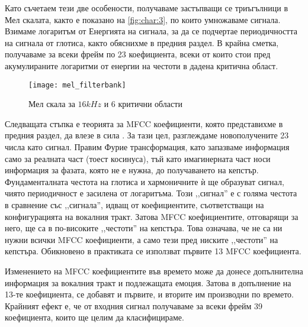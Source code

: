 \documentclass[main.tex]{subfiles}
\begin{document}
    Като съчетаем тези две особености, получаваме застъпващи се триъгълници в Мел скалата, както е показано на \autoref{fig:char:3}, по които умножаваме сигнала. Взимаме логаритъм от Енергията на сигнала, за да се подчертае периодичността на сигнала от глотиса, както обяснихме в предния раздел.
    В крайна сметка, получаваме за всеки фрейм по 23 коефициента, всеки от които стои пред акумулираните логаритми от енергии на честоти в дадена критична област.

    \begin{figure}[H]
        \centering
        \texttt{[image: mel\_filterbank]}%
        \caption{Мел скала за $16kHz$ и 6 критични области}
        \label{fig:char:3}
    \end{figure}

    Следващата стъпка е теорията за MFCC коефициенти, която представихме в предния раздел, да влезе в сила . За тази цел, разглеждаме новополучените 23 числа като сигнал.  Правим Фурие трансформация, като запазваме информация само за реалната част (тоест косинуса), тъй като имагинерната част носи информация за фазата, която не е нужна, до получаването на кепстър. Фундаменталната честота на глотиса и хармоничните ѝ ще образуват сигнал, чиято периодичност е засилена от логаритъма. Този ,,сигнал'' е с голяма честота в сравнение със ,,сигнала'', идващ от коефициентите, съответстващи на конфигурацията на вокалния тракт. Затова MFCC коефициентите, отговарящи за него, ще са в по-високите ,,честоти'' на кепстъра.
    Това означава, че не са ни нужни всички MFCC коефициенти, а само тези пред ниските ,,честоти'' на кепстъра. Обикновено в практиката се използват първите 13 MFCC коефициента.

    Изменението на MFCC коефициентите във времето може да донесе допълнителна информация за вокалния тракт и подлежащата емоция. Затова в допълнение на 13-те коефициента, се добавят и първите, и вторите им производни по времето.
    Крайният ефект е, че от входния сигнал получаваме за всеки фрейм 39 коефициента, които ще целим да класифицираме.
\end{document}
